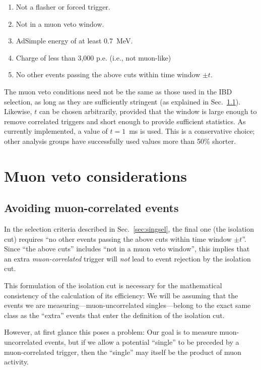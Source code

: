 \documentclass[../thesis.tex]{subfiles}
\begin{document}
\begin{enumerate}
\item Not a flasher or forced trigger.
\item Not in a muon veto window.
\item AdSimple energy of at least 0.7~MeV.
\item Charge of less than 3,000 p.e. (i.e., not muon-like)
\item No other events passing the above cuts within time window $\pm t$.
\end{enumerate}

The muon veto conditions need not be the same as those used in the IBD selection, as long as they are sufficiently stringent (as explained in Sec.~\ref{sec:avoidmuoncorr}).  Likewise, $t$ can be chosen arbitrarily, provided that the window is large enough to remove correlated triggers and short enough to provide sufficient statistics. As currently implemented, a value of $t = 1$~ms is used. This is a conservative choice; other analysis groups have successfully used values more than 50\% shorter.

\section{Muon veto considerations}
\label{sec:muonventoconsider}

\subsection{Avoiding muon-correlated events}
\label{sec:avoidmuoncorr}

In the selection criteria described in Sec.~\ref{sec:singsel}, the final one  (the isolation cut) requires ``no other events passing the above cuts within time window $\pm t$''. Since ``the above cuts'' includes ``not in a muon veto window'', this implies that an extra \emph{muon-correlated} trigger will \emph{not} lead to event rejection by the isolation cut.

This formulation of the isolation cut is necessary for the mathematical consistency of the calculation of its efficiency: We will be assuming that the events we are measuring---muon-uncorrelated singles---belong to the exact same class as the ``extra'' events that enter the definition of the isolation cut.

However, at first glance this poses a problem: Our goal is to measure muon-uncorrelated events, but if we allow a potential ``single'' to be preceded by a muon-correlated trigger, then the ``single'' may itself be the product of muon activity. 
\end{document}
